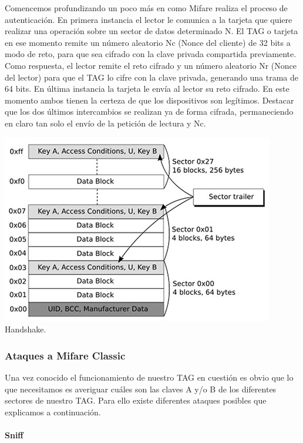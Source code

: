 Comencemos profundizando un poco más en como Mifare realiza el proceso
de autenticación. En primera instancia el lector le comunica a la
tarjeta que quiere realizar una operación sobre un sector de datos
determinado N. El TAG o tarjeta en ese momento remite un número
aleatorio Nc (Nonce del cliente) de 32 bits a modo de reto, para que sea
cifrado con la clave privada compartida previamente. Como respuesta, el
lector remite el reto cifrado y un número aleatorio Nr (Nonce del
lector) para que el TAG lo cifre con la clave privada, generando una
trama de 64 bits. En última instancia la tarjeta le envía al lector su
reto cifrado. En este momento ambos tienen la certeza de que los
dispositivos son legítimos. Destacar que los dos últimos intercambios se
realizan ya de forma cifrada, permaneciendo en claro tan solo el envío
de la petición de lectura y Nc.

\includegraphics{memoria/images/fig4-3.jpg} Handshake.

\subsubsection{Ataques a Mifare Classic}\label{ataques-a-mifare-classic}

Una vez conocido el funcionamiento de nuestro TAG en cuestión es obvio
que lo que necesitamos es averiguar cuáles son las claves A y/o B de los
diferentes sectores de nuestro TAG. Para ello existe diferentes ataques
posibles que explicamos a continuación.

\paragraph{Sniff}\label{sniff}

